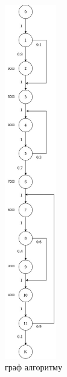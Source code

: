 \begin{figure}[h]
    \centering
    \includegraphics[width=0.2\textwidth]{reports/algos/lab1/assets/4.jpg}
    \caption{граф алгоритму}
\end{figure}

